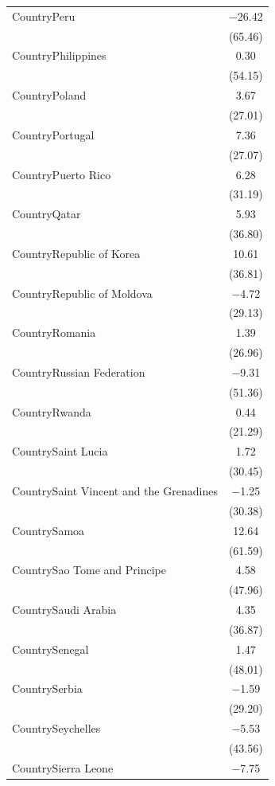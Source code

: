 \documentclass[
  letterpaper,
  DIV=11,
  numbers=noendperiod]{scrartcl}
\begin{document}
\begin{table}
{\begin{tabular}[t]{lc}
CountryPeru & \num{-26.42}\\
 & (\num{65.46})\\
CountryPhilippines & \num{0.30}\\
 & (\num{54.15})\\
CountryPoland & \num{3.67}\\
 & \vphantom{1} (\num{27.01})\\
CountryPortugal & \num{7.36}\\
 & (\num{27.07})\\
CountryPuerto Rico & \num{6.28}\\
 & (\num{31.19})\\
CountryQatar & \num{5.93}\\
 & (\num{36.80})\\
CountryRepublic of Korea & \num{10.61}\\
 & (\num{36.81})\\
CountryRepublic of Moldova & \num{-4.72}\\
 & (\num{29.13})\\
CountryRomania & \num{1.39}\\
 & (\num{26.96})\\
CountryRussian Federation & \num{-9.31}\\
 & (\num{51.36})\\
CountryRwanda & \num{0.44}\\
 & \vphantom{1} (\num{21.29})\\
CountrySaint Lucia & \num{1.72}\\
 & (\num{30.45})\\
CountrySaint Vincent and the Grenadines & \num{-1.25}\\
 & (\num{30.38})\\
CountrySamoa & \num{12.64}\\
 & (\num{61.59})\\
CountrySao Tome and Principe & \num{4.58}\\
 & (\num{47.96})\\
CountrySaudi Arabia & \num{4.35}\\
 & (\num{36.87})\\
CountrySenegal & \num{1.47}\\
 & (\num{48.01})\\
CountrySerbia & \num{-1.59}\\
 & (\num{29.20})\\
CountrySeychelles & \num{-5.53}\\
 & (\num{43.56})\\
CountrySierra Leone & \num{-7.75}\\

\end{tabular}}
\end{table}
\end{document}
